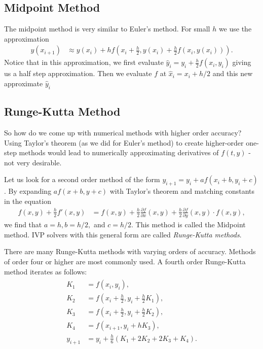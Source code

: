 \subsection*{Midpoint Method}

The midpoint method is very similar to Euler's method.
For small $h$ we use the approximation
\begin{align*}
y(x_{i+1}) &\approx  y(x_{i}) + h f(x_{i}+\frac{h}{2},y(x_{i})+\frac{h}{2} f(x_{i},y(x_{i}))).
\end{align*}
Notice that in this approximation, we first evaluate $\hat y_i = y_i+\frac{h}{2}f(x_i, y_i)$ giving us a half step approximation.
Then we evaluate $f$ at $\hat x_i = x_i+h/2$ and this new approximate $\hat y_i$

\subsection*{Runge-Kutta Method}

So how do we come up with numerical methods with higher order accuracy? 
Using Taylor's theorem (as we did for Euler's method) to create higher-order one-step methods would lead to numerically approximating derivatives of $f(t,y)$ - not very desirable.

Let us look for a second order method of the form $y_{i+1} = y_i + a f(x_i+b, y_i+c)$. 
By expanding $a f(x+b, y+c)$ with Taylor's theorem and matching constants in the equation
\begin{align*}
f(x,y) + \frac{h}{2}f'(x,y) &= f(x,y) + \frac{h}{2}\frac{\partial f}{\partial x}(x,y) + \frac{h}{2}\frac{\partial f}{\partial y}(x,y) \cdot f(x,y),
\end{align*}
we find that $a = h, b = h/2,$ and $c = h/2$. 
This method is called the Midpoint method. 
IVP solvers with this general form are called \textit{Runge-Kutta methods}. 

There are many Runge-Kutta methods with varying orders of accuracy. 
Methods of order four or higher are most commonly used. A fourth order Runge-Kutta method iterates as follows: 
\begin{align*}
	\begin{split}
K_1 &= f(x_i,y_i), \\
K_2 &= f(x_i + \frac{h}{2}, y_i + \frac{h}{2} K_1),\\
K_3 &= f(x_i + \frac{h}{2} , y_i + \frac{h}{2} K_2),\\
K_4 &= f(x_{i+1} , y_i + h K_3),\\
y_{i+1} &= y_i + \frac{h}{6}(K_1 + 2K_2 + 2K_3 + K_4).
	\end{split}
\end{align*}


